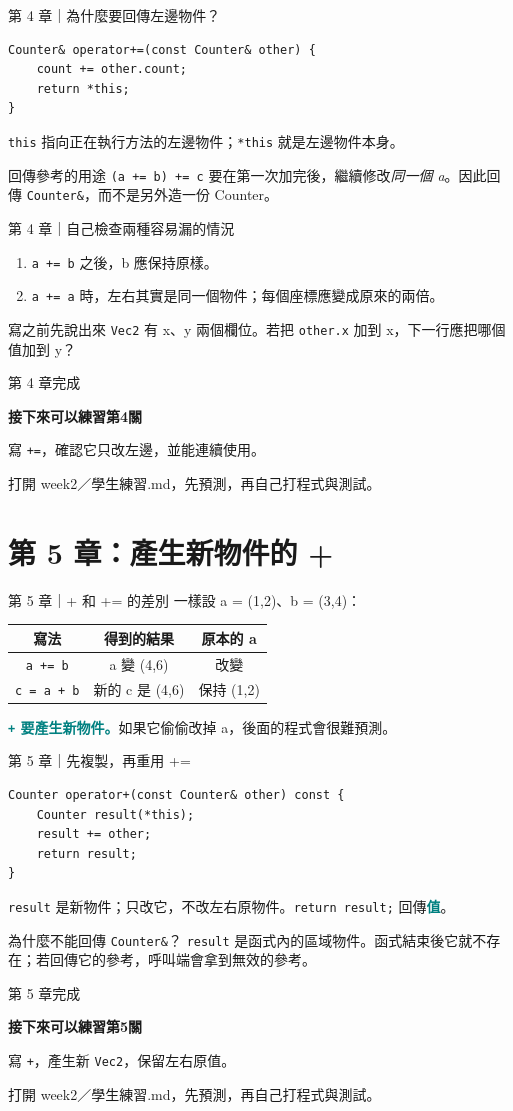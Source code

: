 \documentclass[aspectratio=169,11pt]{beamer}
\newcommand{\key}[1]{\textcolor{teal}{\textbf{#1}}}
\newcommand{\practice}[2]{%
  \begin{frame}[plain]
    \vspace*{1.5cm}
    {\large\color{muted} 第 #1 章完成}\par\vspace{0.45cm}
    {\Huge\bfseries\color{teal} 接下來可以練習第#1關}\par\vspace{0.7cm}
    {\Large #2}\par\vfill
    {\small\color{muted} 打開 week2／學生練習.md，先預測，再自己打程式與測試。}
  \end{frame}
}
\begin{document}
\begin{frame}[fragile]{第 4 章｜為什麼要回傳左邊物件？}
\begin{lstlisting}
Counter& operator+=(const Counter& other) {
    count += other.count;
    return *this;
}
\end{lstlisting}
  \texttt{this} 指向正在執行方法的左邊物件；\texttt{*this} 就是左邊物件本身。
  \begin{block}{回傳參考的用途}
    \texttt{(a += b) += c} 要在第一次加完後，繼續修改\emph{同一個 a}。因此回傳 \texttt{Counter\&}，而不是另外造一份 Counter。
  \end{block}
\end{frame}

\begin{frame}{第 4 章｜自己檢查兩種容易漏的情況}
  \begin{enumerate}
    \item \texttt{a += b} 之後，b 應保持原樣。
    \item \texttt{a += a} 時，左右其實是同一個物件；每個座標應變成原來的兩倍。
  \end{enumerate}
  \vspace{0.8em}
  \begin{block}{寫之前先說出來}
    \texttt{Vec2} 有 x、y 兩個欄位。若把 \texttt{other.x} 加到 x，下一行應把哪個值加到 y？
  \end{block}
\end{frame}
\practice{4}{寫 \texttt{+=}，確認它只改左邊，並能連續使用。}

\section{第 5 章：產生新物件的 +}
\begin{frame}{第 5 章｜+ 和 += 的差別}
  一樣設 a = (1,2)、b = (3,4)：
  \begin{center}
  \begin{tabular}{c|c|c}
    寫法 & 得到的結果 & 原本的 a \\ \hline
    \texttt{a += b} & a 變 (4,6) & 改變 \\
    \texttt{c = a + b} & 新的 c 是 (4,6) & 保持 (1,2)
  \end{tabular}
  \end{center}
  \key{\texttt{+} 要產生新物件。}如果它偷偷改掉 a，後面的程式會很難預測。
\end{frame}

\begin{frame}[fragile]{第 5 章｜先複製，再重用 +=}
\begin{lstlisting}
Counter operator+(const Counter& other) const {
    Counter result(*this);
    result += other;
    return result;
}
\end{lstlisting}
  \texttt{result} 是新物件；只改它，不改左右原物件。\texttt{return result;} 回傳\key{值}。
  \begin{block}{為什麼不能回傳 \texttt{Counter\&}？}
    \texttt{result} 是函式內的區域物件。函式結束後它就不存在；若回傳它的參考，呼叫端會拿到無效的參考。
  \end{block}
\end{frame}
\practice{5}{寫 \texttt{+}，產生新 \texttt{Vec2}，保留左右原值。}
\end{document}
